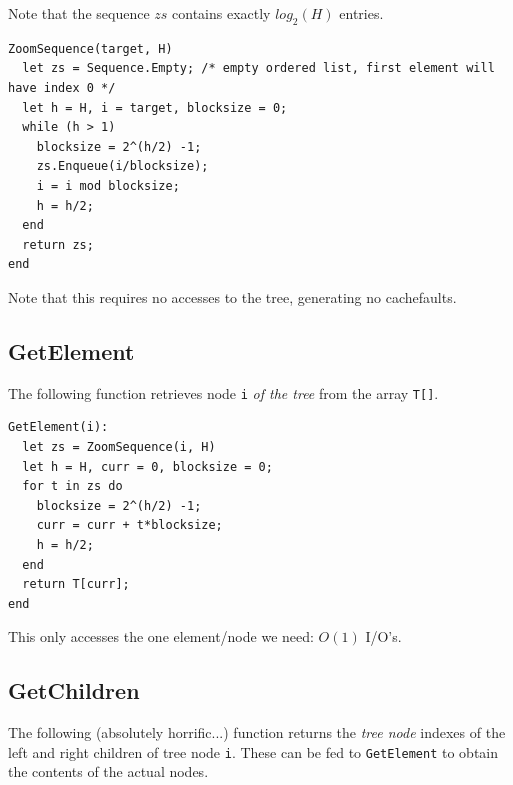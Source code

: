 \documentclass[a4paper]{article}
\begin{document}
Note that the sequence $zs$ contains exactly $log_2(H)$ entries.
\begin{verbatim}
ZoomSequence(target, H)
  let zs = Sequence.Empty; /* empty ordered list, first element will have index 0 */
  let h = H, i = target, blocksize = 0;
  while (h > 1)
    blocksize = 2^(h/2) -1;
    zs.Enqueue(i/blocksize);
    i = i mod blocksize;
    h = h/2;
  end
  return zs;
end
\end{verbatim}

Note that this requires no accesses to the tree, generating no cachefaults.

\subsection*{GetElement}
The following function retrieves node \texttt{i} \emph{of the tree} from the array \texttt{T[]}.
\begin{verbatim}
GetElement(i):
  let zs = ZoomSequence(i, H)
  let h = H, curr = 0, blocksize = 0;
  for t in zs do
    blocksize = 2^(h/2) -1;
    curr = curr + t*blocksize;
    h = h/2;
  end
  return T[curr];
end
\end{verbatim}

This only accesses the one element/node we need: $O(1)$ I/O's.

\subsection*{GetChildren}
The following (absolutely horrific...) function returns the \emph{tree node} indexes of the left and right children of tree node \texttt{i}. These can be fed to \texttt{GetElement} to obtain the contents of the actual nodes.
\end{document}
